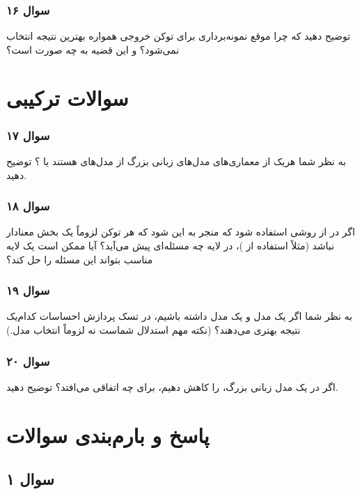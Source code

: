 \documentclass[12pt]{article}
\begin{document}
	\subsubsection*{سوال ۱۶}
	توضیح دهید که چرا موقع نمونه‌برداری برای توکن خروجی همواره بهترین نتیجه انتخاب نمی‌شود؟ و 
	این قضیه به چه صورت است؟
	
	\section{سوالات ترکیبی}
	\subsubsection*{سوال ۱۷}
	به نظر شما هریک از معماری‌های مدل‌های زبانی بزرگ از مدل‌های 
	هستند یا 
	؟ توضیح دهید.
	
	\subsubsection*{سوال ۱۸}
	اگر در 
	از روشی استفاده شود که منجر به این شود که هر توکن لزوماً یک بخش معنادار نباشد (مثلاً استفاده از )، در لایه 
	چه مسئله‌ای پیش می‌آید؟ آیا ممکن است یک لایه 
	مناسب بتواند این مسئله را حل کند؟
	
	\subsubsection*{سوال ۱۹}
	به نظر شما اگر یک مدل 
	و یک مدل 
	داشته باشیم، در تسک پردازش احساسات کدام‌یک نتیجه بهتری می‌دهند؟ (نکته مهم استدلال شماست نه لزوماً انتخاب مدل.)
	
	\subsubsection*{سوال ۲۰}
	اگر در یک مدل زبانی بزرگ، 
	را کاهش دهیم، برای 
	چه اتفاقی می‌افتد؟ توضیح دهید.
	
	\newpage
	\section{پاسخ و بارم‌بندی سوالات}
	\subsection*{سوال ۱}
\end{document}
